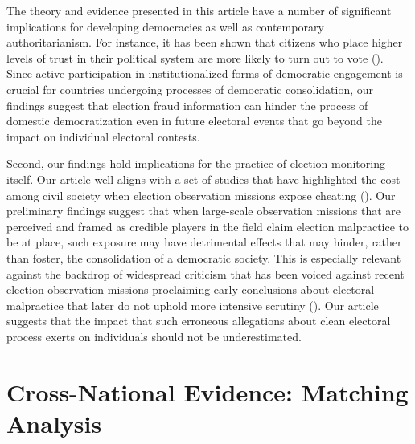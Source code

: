\documentclass[11pt, ngerman,english,a4]{article}
\begin{document}
The theory and evidence presented in this article have a number of significant implications for developing democracies as well as contemporary authoritarianism. For instance, it has been shown that citizens who place higher levels of trust in their political system are more likely to turn out to vote (\citealt{WANG2016291}). Since active participation in institutionalized forms of democratic engagement is crucial for countries undergoing processes of democratic consolidation, our findings suggest that election fraud information can hinder the process of domestic democratization even in future electoral events that go beyond the impact on individual electoral contests. 

Second, our findings hold implications for the practice of election monitoring itself. Our article well aligns with a set of studies that have highlighted the cost among civil society when election observation missions expose cheating (\citealt{Daxecker2012}). Our preliminary findings suggest that when large-scale observation missions that are perceived and framed as credible players in the field claim election malpractice to be at place, such exposure may have detrimental effects that may hinder, rather than foster, the consolidation of a democratic society. This is especially relevant against the backdrop of widespread criticism that has been voiced against recent election observation missions proclaiming early conclusions about electoral malpractice that later do not uphold more intensive scrutiny (\citealt{Idrobo2020}). Our article suggests that the impact that such erroneous allegations about clean electoral process exerts on individuals should not be underestimated. 


\clearpage
\singlespace
 


\newpage
\appendix
\thispagestyle{empty}
\appendixpage
\startcontents[sections]
\newpage
\renewcommand*{\thepage}{A\arabic{page}}
\renewcommand*{\thesection}{\Alph{section}.}
\renewcommand*{\thesubsection}{\alph{subsection}.}
\renewcommand\thefigure{A\arabic{figure}}   
\renewcommand\thetable{A\arabic{table}}  
\setcounter{figure}{0}
\setcounter{table}{0}
\setcounter{page}{1}





\section{Cross-National Evidence: Matching Analysis}
\end{document}
